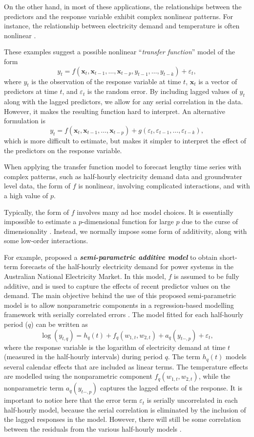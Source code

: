 \documentclass[11pt,a4paper,]{article}
\begin{document}
On the other hand, in most of these applications, the relationships
between the predictors and the response variable exhibit complex
nonlinear patterns. For instance, the relationship between electricity
demand and temperature is often nonlinear \autocite{HF2010,FH2012}.

These examples suggest a possible nonlinear ``\emph{transfer function}''
model of the form \[
 y_t = f(\bm{x}_{t}, \bm{x}_{t-1}, \dots,\bm{x}_{t-p}, y_{t-1},\dots,y_{t-k}) + \varepsilon_{t},
\] where \(y_{t}\) is the observation of the response variable at time
\(t\), \(\bm{x}_{t}\) is a vector of predictors at time \(t\), and
\(\varepsilon_{t}\) is the random error. By including lagged values of
\(y_{t}\) along with the lagged predictors, we allow for any serial
correlation in the data. However, it makes the resulting function hard
to interpret. An alternative formulation is \[
 y_t = f(\bm{x}_{t}, \bm{x}_{t-1}, \dots,\bm{x}_{t-p}) + g(\varepsilon_{t}, \varepsilon_{t-1},\dots,\varepsilon_{t-k}),
\] which is more difficult to estimate, but makes it simpler to
interpret the effect of the predictors on the response variable.

When applying the transfer function model to forecast lengthy time
series with complex patterns, such as half-hourly electricity demand
data and groundwater level data, the form of \(f\) is nonlinear,
involving complicated interactions, and with a high value of \(p\).

Typically, the form of \(f\) involves many ad hoc model choices. It is
essentially impossible to estimate a \(p\)-dimensional function for
large \(p\) due to the curse of dimensionality
\autocite{Bellman57,Stone82}. Instead, we normally impose some form of
additivity, along with some low-order interactions.

For example, \textcite{FH2012} proposed a \textbf{\emph{semi-parametric
additive model}} to obtain short-term forecasts of the half-hourly
electricity demand for power systems in the Australian National
Electricity Market. In this model, \(f\) is assumed to be fully
additive, and is used to capture the effects of recent predictor values
on the demand. The main objective behind the use of this proposed
semi-parametric model is to allow nonparametric components in a
regression-based modelling framework with serially correlated errors
\autocite{FH2012}. The model fitted for each half-hourly period (\(q\))
can be written as \[
 \log(y_{t,q}) = h_{q}(t) + f_{q}(w_{1,t},w_{2,t}) + a_{q}(y_{t-,p}) + \varepsilon_{t},
\] where the response variable is the logarithm of electricity demand at
time \(t\) (measured in the half-hourly intervals) during period \(q\).
The term \(h_{q}(t)\) models several calendar effects that are included
as linear terms. The temperature effects are modelled using the
nonparametric component \(f_{q}(w_{1,t},w_{2,t})\), while the
nonparametric term \(a_{q}(y_{t-,p})\) captures the lagged effects of
the response. It is important to notice here that the error term
\(\varepsilon_{t}\) is serially uncorrelated in each half-hourly model,
because the serial correlation is eliminated by the inclusion of the
lagged responses in the model. However, there will still be some
correlation between the residuals from the various half-hourly models
\autocite{FH2012}.
\end{document}
